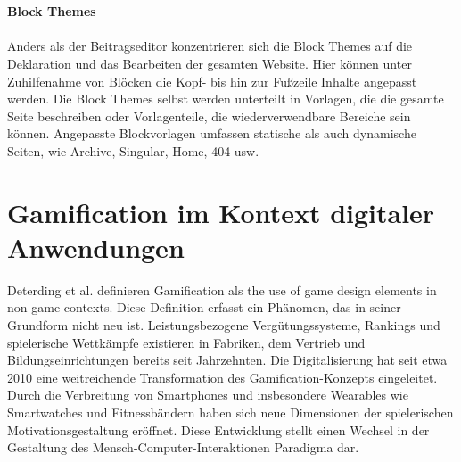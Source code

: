 \\\\
\textbf{Block Themes}
\\\\
Anders als der Beitragseditor konzentrieren sich die Block Themes auf die Deklaration und das Bearbeiten der gesamten Website.
Hier können unter Zuhilfenahme von Blöcken die Kopf- bis hin zur Fußzeile Inhalte angepasst werden.
Die Block Themes selbst werden unterteilt in Vorlagen, die die gesamte Seite beschreiben oder Vorlagenteile, die wiederverwendbare Bereiche sein können.
Angepasste Blockvorlagen umfassen statische als auch dynamische Seiten, wie Archive, Singular, Home, 404 usw. \cite{wordpress2024EditorTemplates}


\section{Gamification im Kontext digitaler Anwendungen}

Deterding et al. definieren Gamification als \grqq{}the use of game design elements in non-game contexts\grqq{}. \cite{deterding2011gamification}
Diese Definition erfasst ein Phänomen, das in seiner Grundform nicht neu ist.
Leistungsbezogene Vergütungssysteme, Rankings und spielerische Wettkämpfe existieren in Fabriken, dem Vertrieb und Bildungseinrichtungen bereits seit Jahrzehnten. \cite{bpb2023gamification}
Die Digitalisierung hat seit etwa 2010 eine weitreichende Transformation des Gamification-Konzepts eingeleitet.
Durch die Verbreitung von Smartphones und insbesondere Wearables wie Smartwatches und Fitnessbändern haben sich neue Dimensionen der spielerischen Motivationsgestaltung eröffnet. \cite{sailer2016gamification}
Diese Entwicklung stellt einen Wechsel in der Gestaltung des Mensch-Computer-Interaktionen Paradigma dar.

